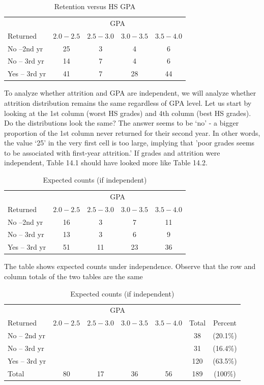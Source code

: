 \documentclass[11pt, chapterprefix=true]{scrbook}\usepackage[]{graphicx}\usepackage[]{color}
\begin{document}
\begin{table}[ht]
\centering
\caption{Retention versus HS GPA}
\begin{tabular}{@{} lcccc @{}} \hline
& \multicolumn{4}{c}{GPA} \\
Returned & $2.0-2.5$ & $2.5-3.0$ & $3.0-3.5$ & $3.5-4.0$ \\ \hline
No --2nd yr & 25 & 3 & 4 & 6 \\
No -- 3rd yr & 14 & 7 & 4 & 6 \\
Yes -- 3rd yr & 41 & 7 & 28 & 44 \\ \hline
\end{tabular}
\end{table}

To analyze whether attrition and GPA are independent, we will analyze whether attrition distribution remains the same regardless of GPA level.  Let us start by looking at the 1st column (worst HS grades) and 4th column (best HS grades).  Do the distributions look the same?   The answer seems to be `no' - a bigger proportion of the 1st column never returned for their second year.  In other words, the value `25' in the very first cell is too large, implying that 'poor grades seems to be associated with first-year attrition.'  If grades and attrition were independent, Table 14.1 should have looked more like Table 14.2.

\begin{table}[ht]
\centering
\caption{Expected counts (if independent)}
\begin{tabular}{@{} lcccc @{}} \hline
& \multicolumn{4}{c}{GPA} \\
Returned & $2.0-2.5$ & $2.5-3.0$ & $3.0-3.5$ & $3.5-4.0$ \\ \hline
No --2nd yr & 16 & 3 & 7 & 11 \\
No -- 3rd yr & 13 & 3 & 6 & 9 \\
Yes -- 3rd yr & 51 & 11 & 23 & 36 \\ \hline
\end{tabular}
\end{table}

The table shows expected counts under independence.  Observe that the row and column totals of the two tables are the same

\begin{table}[ht]
\centering
\caption{Expected counts (if independent)}
\begin{tabular}{@{} lcccccc @{}} \hline
& \multicolumn{4}{c}{GPA} \\
Returned & $2.0-2.5$ & $2.5-3.0$ & $3.0-3.5$ & $3.5-4.0$ & Total & Percent \\ \hline
No -- 2nd yr &  &  &  &  & 38 & (20.1\%) \\
No -- 3rd yr &  &  &  &  & 31 & (16.4\%)\\
Yes -- 3rd yr &  &  &  &  & 120 & (63.5\%) \\ \hline
Total        & 80 & 17 & 36 & 56 & 189 & (100\%) \\
\end{tabular}
\end{table}
\end{document}
